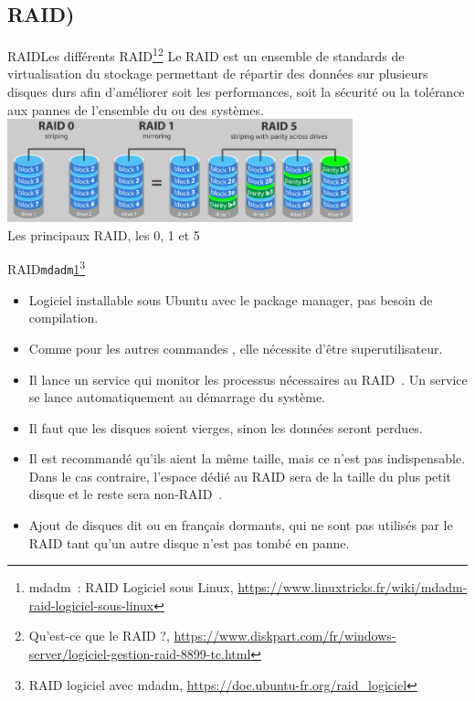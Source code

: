 \documentclass{beamer}
\begin{document}
    \subsection{RAID)}\label{subsec:raid}

    \begin{frame}{RAID}{Les différents RAID\footnote{\label{mdadm}mdadm~: RAID Logiciel sous Linux, \url{https://www.linuxtricks.fr/wiki/mdadm-raid-logiciel-sous-linux}}\footnotestep\footnote{Qu'est-ce que le RAID ?, \url{https://www.diskpart.com/fr/windows-server/logiciel-gestion-raid-8899-tc.html}}}
        Le RAID est un ensemble de standards de virtualisation du stockage permettant de répartir des données sur plusieurs disques durs afin d'améliorer soit les performances, soit la sécurité ou la tolérance aux pannes de l'ensemble du ou des systèmes.
        \bigbreak
        \centering
        \includegraphics[width=10cm]{image/raid-0-1-5} \\ Les principaux RAID, les 0, 1 et 5 \\
    \end{frame}

    \begin{frame}{RAID}{\lstinline{mdadm}\cref{mdadm}\footnotestep\footnote{RAID logiciel avec mdadm, \url{https://doc.ubuntu-fr.org/raid_logiciel}}}
        \begin{itemize}
            \item Logiciel installable sous Ubuntu avec le package manager, pas besoin de compilation.
            \item Comme pour les autres commandes , elle nécessite d'être superutilisateur.
            \item Il lance un service qui monitor les processus nécessaires au RAID~.
            Un service se lance automatiquement au démarrage du système.
            \item Il faut que les disques soient vierges, sinon les données seront perdues.
            \item Il est recommandé qu'ils aient la même taille, mais ce n'est pas indispensable.
            Dans le cas contraire, l'espace dédié au RAID sera de la taille du plus petit disque et le reste sera non-RAID~.
            \item Ajout de disques dit  ou en français dormants, qui ne sont pas utilisés par le RAID tant qu'un autre disque n'est pas tombé en panne.
        \end{itemize}
    \end{frame}
\end{document}
